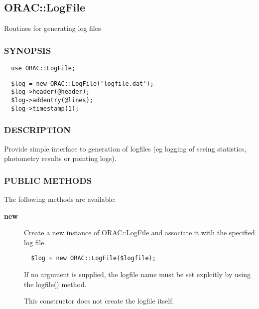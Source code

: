 \begin{description}
\subsection{ORAC::LogFile\label{ORAC::LogFile}}


Routines for generating log files

\subsubsection*{SYNOPSIS\label{ORAC::LogFile_SYNOPSIS}}
\begin{verbatim}
  use ORAC::LogFile;
\end{verbatim}
\begin{verbatim}
  $log = new ORAC::LogFile('logfile.dat');
  $log->header(@header);
  $log->addentry(@lines);
  $log->timestamp(1);
\end{verbatim}
\subsubsection*{DESCRIPTION\label{ORAC::LogFile_DESCRIPTION}}


Provide simple interface to generation of logfiles (eg logging
of seeing statistics, photometry results or pointing logs).

\subsubsection*{PUBLIC METHODS\label{ORAC::LogFile_PUBLIC_METHODS}}


The following methods are available:

\begin{description}

\item[{\textbf{new}}] \mbox{}

Create a new instance of ORAC::LogFile and associate it with the 
specified log file.

\begin{verbatim}
  $log = new ORAC::LogFile($logfile);
\end{verbatim}


If no argument is supplied, the logfile name must be set explcitly
by using the logfile() method.



This constructor does not create the logfile itself.



\end{description}
\end{description}
